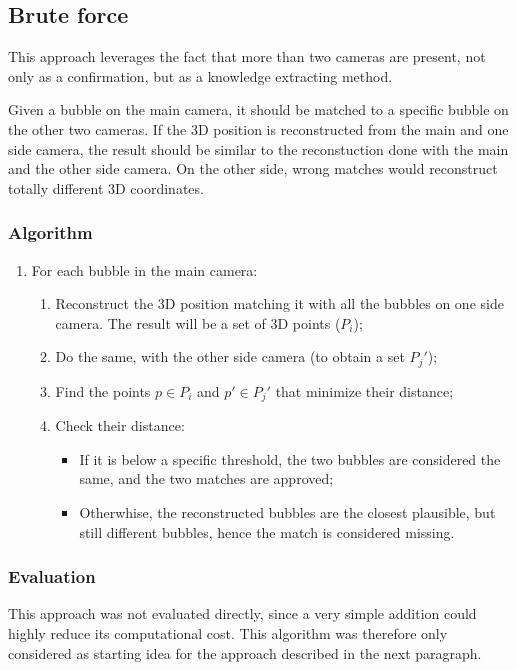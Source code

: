 \subsection{Brute force}
\label{sec:match:bruteforce}

This approach leverages the fact that more than two cameras are present, not only as a confirmation, but as a knowledge extracting method.

Given a bubble on the main camera, it should be matched to a specific bubble on the other two cameras.
If the 3D position is reconstructed from the main and one side camera, the result should be similar to the reconstuction done with the main and the other side camera.
On the other side, wrong matches would reconstruct totally different 3D coordinates.

\subsubsection{Algorithm}

\begin{enumerate}
	\itemsep 0em
	\item For each bubble in the main camera:
	      \begin{enumerate}
		      \item Reconstruct the 3D position matching it with all the bubbles on one side camera. The result will be a set of 3D points ($P_i$);
		      \item Do the same, with the other side camera (to obtain a set $P_j'$);
		      \item Find the points $p\in P_i$ and $p'\in P_j'$ that minimize their distance;
		      \item Check their distance:
		      \begin{itemize}
				\item If it is below a specific threshold, the two bubbles are considered the same, and the two matches are approved;
				\item Otherwhise, the reconstructed bubbles are the closest plausible, but still different bubbles, hence the match is considered missing.
			  \end{itemize}
	      \end{enumerate}
\end{enumerate}

\subsubsection{Evaluation}

This approach was not evaluated directly, since a very simple addition could highly reduce its computational cost.
This algorithm was therefore only considered as starting idea for the approach described in the next paragraph.
